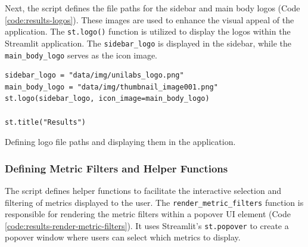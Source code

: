 Next, the script defines the file paths for the sidebar and main body logos (Code \ref{code:results-logos}). These images are used to enhance the visual appeal of the application. The \texttt{st.logo()} function is utilized to display the logos within the Streamlit application. The \texttt{sidebar\_logo} is displayed in the sidebar, while the \texttt{main\_body\_logo} serves as the icon image.

\begin{longlisting}
\begin{verbatim}
sidebar_logo = "data/img/unilabs_logo.png"
main_body_logo = "data/img/thumbnail_image001.png"
st.logo(sidebar_logo, icon_image=main_body_logo)

st.title("Results")
\end{verbatim}
\caption{Defining logo file paths and displaying them in the application.}
\label{code:results-logos}
\end{longlisting}

\subsubsection{\textbf{Defining Metric Filters and Helper Functions}}

The script defines helper functions to facilitate the interactive selection and filtering of metrics displayed to the user. The \texttt{render\_metric\_filters} function is responsible for rendering the metric filters within a popover UI element (Code \ref{code:results-render-metric-filters}). It uses Streamlit's \texttt{st.popover} to create a popover window where users can select which metrics to display.

